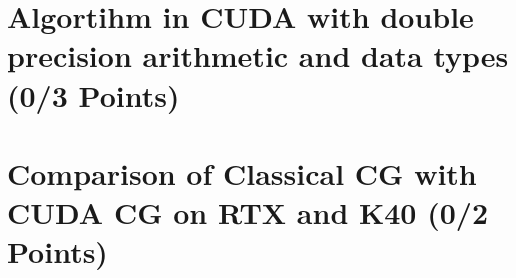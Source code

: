 
\section{Algortihm in CUDA with double precision arithmetic and data types (0/3 Points)}

\section{Comparison of Classical CG with CUDA CG on RTX and K40 (0/2 Points)}
\pagebreak